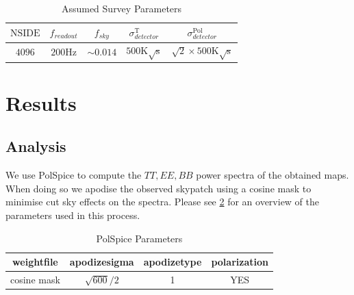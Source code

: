 \documentclass[apj]{emulateapj}
\begin{document}
\begin{table}[tbh]
\begin{center}
\caption{\label{tab:modelparams} Assumed Survey Parameters}
\small
\begin{tabular}{c c c c c}
$\mathrm{NSIDE}$ & $f_{readout}$ & $f_{sky}$ & $\sigma^{\mathrm{T}}_{detector}$ & $\sigma^{\mathrm{Pol}}_{detector}$\\
\hline
$4096$ & $200\mathrm{Hz}$ & $\sim 0.014$ & $500\mathrm{K}\sqrt{\mathrm{s}}$ & $\sqrt{2}\times500\mathrm{K}\sqrt{\mathrm{s}}$\\

\end{tabular}
 \normalsize
\end{center}
\end{table}



\section{Results}
\label{sec:results}

\subsection{Analysis}
\label{subsec:analysis}

We use PolSpice to compute the $TT, EE, BB$ power spectra of the obtained maps. When doing so we apodise the observed skypatch using a cosine mask to minimise cut sky effects on the spectra. Please see \ref{tab:polspiceparams} for an overview of the parameters used in this process.

\begin{table}[tbh]
\begin{center}
\caption{\label{tab:polspiceparams} PolSpice Parameters}
\small
\begin{tabular}{c c c c}
weightfile & apodizesigma & apodizetype & polarization \\
\hline
cosine mask & $\sqrt{600}/2$ & 1 & YES \\

\end{tabular}
 \normalsize
\end{center}
\end{table}
\end{document}
